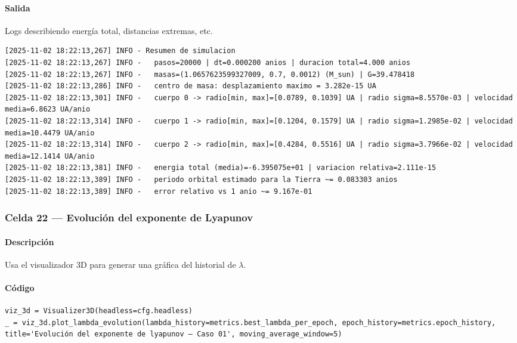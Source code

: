\paragraph{Salida} Logs describiendo energía total, distancias extremas, etc.

\begin{listing}[H]
\caption{Ejemplo Salida}
\begin{adjustbox}{max width=0.7\textwidth}
\begin{minipage}{\textwidth}
\begin{verbatim}
[2025-11-02 18:22:13,267] INFO - Resumen de simulacion
[2025-11-02 18:22:13,267] INFO -   pasos=20000 | dt=0.000200 anios | duracion total=4.000 anios
[2025-11-02 18:22:13,267] INFO -   masas=(1.0657623599327009, 0.7, 0.0012) (M_sun) | G=39.478418
[2025-11-02 18:22:13,286] INFO -   centro de masa: desplazamiento maximo = 3.282e-15 UA
[2025-11-02 18:22:13,301] INFO -   cuerpo 0 -> radio[min, max]=[0.0789, 0.1039] UA | radio sigma=8.5570e-03 | velocidad media=6.8623 UA/anio
[2025-11-02 18:22:13,314] INFO -   cuerpo 1 -> radio[min, max]=[0.1204, 0.1579] UA | radio sigma=1.2985e-02 | velocidad media=10.4479 UA/anio
[2025-11-02 18:22:13,314] INFO -   cuerpo 2 -> radio[min, max]=[0.4284, 0.5516] UA | radio sigma=3.7966e-02 | velocidad media=12.1414 UA/anio
[2025-11-02 18:22:13,381] INFO -   energia total (media)=-6.395075e+01 | variacion relativa=2.111e-15
[2025-11-02 18:22:13,389] INFO -   periodo orbital estimado para la Tierra ~= 0.083303 anios
[2025-11-02 18:22:13,389] INFO -   error relativo vs 1 anio ~= 9.167e-01
\end{verbatim}
\end{minipage}
\end{adjustbox}
\end{listing}

\subsubsection*{Celda 22 — Evolución del exponente de Lyapunov}
\paragraph{Descripción} Usa el visualizador 3D para generar una gráfica del historial de $\lambda$.
\paragraph{Código}
\begin{listing}[H]
\caption{Celda 22: gráfico de $\lambda$ por época}
\begin{adjustbox}{max width=\textwidth}
\begin{minipage}{\textwidth}
\begin{verbatim}
viz_3d = Visualizer3D(headless=cfg.headless)
_ = viz_3d.plot_lambda_evolution(lambda_history=metrics.best_lambda_per_epoch, epoch_history=metrics.epoch_history, title='Evolución del exponente de lyapunov – Caso 01', moving_average_window=5)
\end{verbatim}
\end{minipage}
\end{adjustbox}
\end{listing}
